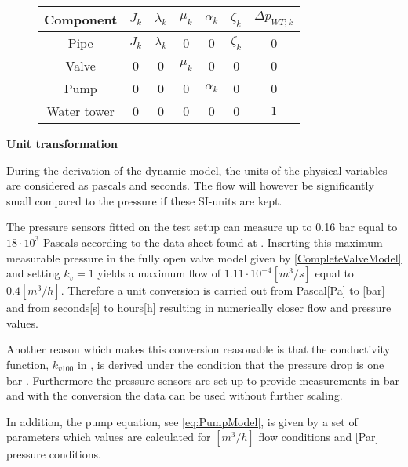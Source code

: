 \begin{figure}[H]
	\centering
\begin{tabular}{c|cccccc} 
		\bfseries Component    &     $J_k$  &$\lambda_k$    &    $\mu_k$    &   $\alpha_k$   &  $\zeta_k$   &  $\Delta p_{WT;k}$ \\\hline
		Pipe			  	   &     $J_k$  &$\lambda_k$    &    0          &   0            &  $\zeta_k$   &  0	    			\\ 
		Valve       	       &     0      &0              &    $\mu_k$    &   0 		     &  0    		&  0					\\ 
		Pump 		    	   &     0      &0              &    0          &   $\alpha_k$   &  0    		&  0	    			\\
		Water tower 	   	   &     0      &0              &    0          &   0            &  0    		&  $1$	
\end{tabular}
		\label{tab:parametrization_model}

\end{figure}	

\textbf{Unit transformation}
\label{unittransform}

During the derivation of the dynamic model, the units of the physical variables are considered as pascals and seconds. The flow will however be significantly small compared to the pressure if these SI-units are kept.

The pressure sensors fitted on the test setup can measure up to 0.16 bar equal to $18 \cdot 10^3$ Pascals according to the data sheet found at . Inserting this maximum measurable pressure in the fully open valve model given by \eqref{CompleteValveModel} and setting $k_v=1$ yields a maximum flow of $1.11 \cdot 10^{-4} [m^3/s]$ equal to $0.4 [m^3/h]$. 
Therefore a unit conversion is carried out from Pascal[Pa] to [bar] and from seconds[s] to hours[h] resulting in numerically closer flow and pressure values. 

Another reason which makes this conversion reasonable is that the conductivity function, $k_{v100}$ in , is derived under the condition that the pressure drop is one bar \cite{keller}. Furthermore the pressure sensors are set up to provide measurements in bar and with the conversion the data can be used without further scaling.  

In addition, the pump equation, see \eqref{eq:PumpModel}, is given by a set of parameters which values are calculated for $[m^3/h]$ flow conditions and [Par] pressure conditions. 


